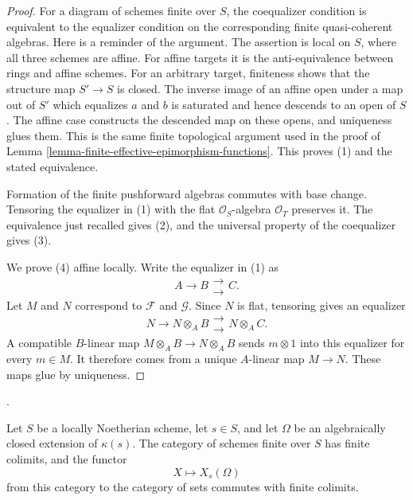 \begin{proof}
For a diagram of schemes finite over $S$, the coequalizer condition is
equivalent to the equalizer condition on the corresponding finite
quasi-coherent algebras. Here is a reminder of the argument. The assertion
is local on $S$, where all three schemes are affine. For affine targets it
is the anti-equivalence between rings and affine schemes. For an arbitrary
target, finiteness shows that the structure map $S' \to S$ is closed. The
inverse image of an affine open under a map out of $S'$ which equalizes
$a$ and $b$ is saturated and hence descends to an open of $S$. The affine
case constructs the descended map on these opens, and uniqueness glues
them. This is the same finite topological argument used in the proof of
Lemma \ref{lemma-finite-effective-epimorphism-functions}. This proves (1)
and the stated equivalence.

Formation of the finite pushforward algebras commutes with base change.
Tensoring the equalizer in (1) with the flat $\mathcal{O}_S$-algebra
$\mathcal{O}_T$ preserves it. The equivalence just recalled gives (2),
and the universal property of the coequalizer gives (3).

We prove (4) affine locally. Write the equalizer in (1) as
$$
A \longrightarrow B
\mathrel{\substack{\longrightarrow \\[-0.6ex] \longrightarrow}} C.
$$
Let $M$ and $N$ correspond to $\mathcal{F}$ and $\mathcal{G}$. Since $N$
is flat, tensoring gives an equalizer
$$
N \longrightarrow N \otimes_A B
\mathrel{\substack{\longrightarrow \\[-0.6ex] \longrightarrow}}
N \otimes_A C.
$$
A compatible $B$-linear map $M \otimes_A B \to N \otimes_A B$ sends
$m \otimes 1$ into this equalizer for every $m \in M$. It therefore comes
from a unique $A$-linear map $M \to N$. These maps glue by uniqueness.
\end{proof}

\begin{proposition}
\label{proposition-finite-schemes-geometric-fibre-colimits}
\begin{reference}
\cite[Expos\'e 212, Proposition 2.1, pp. 103--104]{FGA}.
\end{reference}
Let $S$ be a locally Noetherian scheme, let $s \in S$, and let $\Omega$
be an algebraically closed extension of $\kappa(s)$. The category of schemes
finite over $S$ has finite colimits, and the functor
$$
X \longmapsto X_s(\Omega)
$$
from this category to the category of sets commutes with finite colimits.
\end{proposition}

